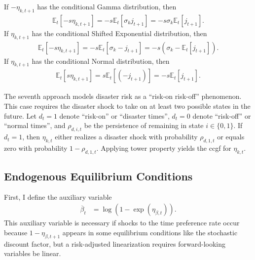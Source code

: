 \documentclass[12 pt, oneside]{article}
\theoremstyle{definition}
\theoremstyle{definition}
\theoremstyle{definition}
\newcommand{\E}{\mathbb{E}}
\begin{document}
If $-\eta_{k, t + 1}$ has the conditional Gamma distribution, then
\begin{align*}
\E_t[-s \eta_{k, t + 1}] = -s\E_t[\sigma_k j_{t + 1}] = -s\sigma_k \E_t[j_{t + 1}].
\end{align*}
If $\eta_{k, t + 1}$ has the conditional Shifted Exponential distribution, then
\begin{align*}
\E_t[-s \eta_{k, t + 1}] = -s \E_t[\sigma_k - j_{t + 1}] = -s(\sigma_k - \E_t[j_{t + 1}]).
\end{align*}
If $\eta_{k, t + 1}$ has the conditional Normal distribution, then
\begin{align*}
\E_t[s\eta_{k, t + 1}] = s \E_t[(-j_{t + 1})] = -s\E_t[j_{t + 1}].
\end{align*}


The seventh approach models disaster risk as a ``risk-on risk-off'' phenomenon. This case requires the disaster shock to take on at least two possible states in the future. Let $d_t = 1$ denote ``risk-on'' or ``disaster times'', $d_t = 0$ denote ``risk-off'' or ``normal times'', and  $\rho_{d, i, t}$ be the persistence of remaining in state $i \in \{0, 1\}$. If $d_t= 1$, then $\eta_{k, t}$ either realizes a disaster shock with probability $\rho_{d, 1, t}$ or equals zero with probability $1 - \rho_{d, 1, t}$. Applying tower property yields the ccgf for $\eta_{k, t}$.

\subsection{Endogenous Equilibrium Conditions}
First, I define the auxiliary variable
\begin{align}
  \overline{\beta}_t & = \log(1 - \exp(\eta_{\beta, t})).
\end{align}
This auxiliary variable is necessary if shocks to the time preference rate occur because $1 - \eta_{\beta, t + 1}$ appears in some equilibrium conditions like the stochastic discount factor, but a risk-adjusted linearization requires forward-looking variables be linear.
\end{document}
